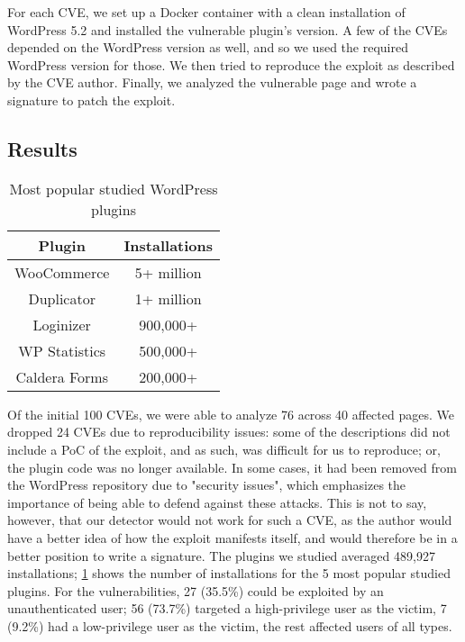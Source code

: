 For each CVE, we set up a Docker container with a clean installation of WordPress 5.2 and installed the vulnerable plugin's version. A few of the CVEs depended on the WordPress version as well, and so we used the required WordPress version for those. We then tried to reproduce the exploit as described by the CVE author. Finally, we analyzed the vulnerable page and wrote a signature to patch the exploit.

\subsection{Results}

\begin{table}[h!]
	\begin{center}
		\begin{tabular}{|c c|} 
			\hline
			Plugin & Installations\\ [1ex] 
			\hline
			WooCommerce  & 5+ million  \\  
			Duplicator & 1+ million \\  
			Loginizer & 900,000+ \\  
			WP Statistics & 500,000+ \\  
			Caldera Forms & 200,000+ \\   
			\hline
		\end{tabular}
		\caption{Most popular studied WordPress plugins}
		\label{table:1}
	\end{center}
\end{table}

\vspace{-0.3in}

Of the initial 100 CVEs, we were able to analyze 76 across 40 affected pages. We dropped 24 CVEs due to reproducibility issues: some of the descriptions did not include a PoC of the exploit, and as such, was difficult for us to reproduce; or, the plugin code was no longer available. In some cases, it had been removed from the WordPress repository due to "security issues", which emphasizes the importance of being able to defend against these attacks. This is not to say, however, that our detector would not work for such a CVE, as the author would have a better idea of how the exploit manifests itself, and would therefore be in a better position to write a signature. The plugins we studied averaged 489,927 installations; \ref{table:1} shows the number of installations for the 5 most popular studied plugins. For the vulnerabilities, 27 (35.5\%) could be exploited by an unauthenticated user; 56 (73.7\%) targeted a high-privilege user as the victim, 7 (9.2\%) had a low-privilege user as the victim, the rest affected users of all types.

